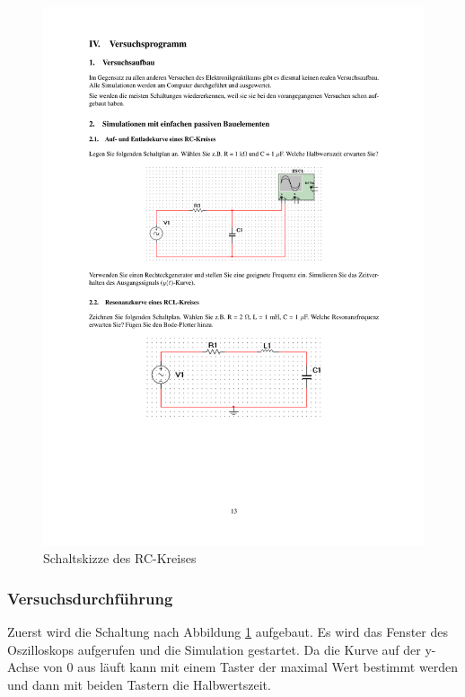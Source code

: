 \documentclass[12pt,a4paper]{article}
\begin{document}
\begin{figure}[H] 
  \centering
    \includegraphics[trim = 10mm 155mm 10mm 85mm, clip, scale = 1]{ep5_14[Page13].pdf}
  	\caption[Schaltskizze des RC-Kreises]{Schaltskizze des RC-Kreises\footnotemark}
  \label{fig:1_a_1}
\end{figure}

\subsubsection{Versuchsdurchführung}


Zuerst wird die Schaltung nach Abbildung \ref{fig:1_a_1} aufgebaut. Es wird das Fenster des Oszilloskops aufgerufen und die Simulation gestartet. Da die Kurve auf der y-Achse von 0 aus läuft kann mit einem Taster der maximal Wert bestimmt werden und  dann mit beiden Tastern die Halbwertszeit.
\end{document}

